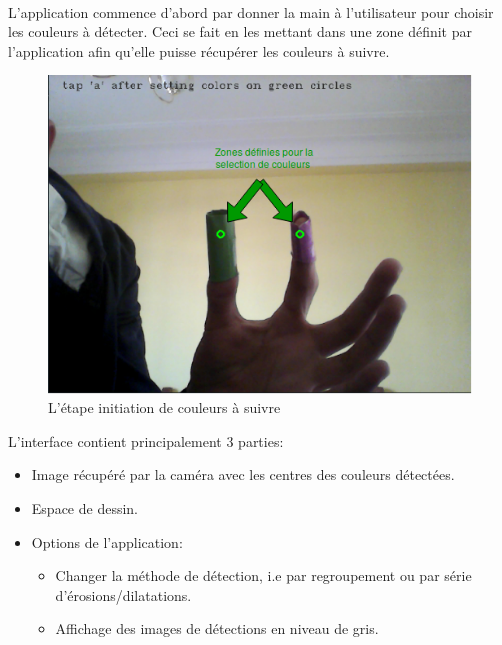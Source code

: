 \documentclass[12pt]{report}
\begin{document}
\paragraph{}
L’application commence d’abord par donner la main à l’utilisateur pour choisir les couleurs à détecter. Ceci se fait en les mettant dans une zone définit par l’application afin qu’elle puisse récupérer les couleurs à suivre.\\
\begin{figure}[H]
	\centering
	\includegraphics[scale=0.6]{imgs/initColors.png}
	\caption{L'étape initiation de couleurs à suivre}
	\label{fig:InitColors}
\end{figure}
L’interface contient principalement 3 parties:
\begin{itemize}
	\item Image récupéré par la caméra avec les centres des couleurs détectées.
	\item Espace de dessin.
	\item Options de l’application:
	\begin{itemize}
		\item Changer la méthode de détection, i.e par regroupement ou par série d’érosions/dilatations.
		\item Affichage des images de détections en niveau de gris.
	\end{itemize}
\end{itemize}
\end{document}

